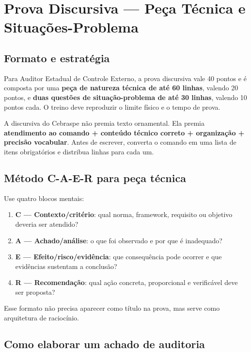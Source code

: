 \chapter{Prova Discursiva — Peça Técnica e Situações-Problema}

\section{Formato e estratégia}

Para Auditor Estadual de Controle Externo, a prova discursiva vale 40 pontos e é composta por uma \textbf{peça de natureza técnica de até 60 linhas}, valendo 20 pontos, e \textbf{duas questões de situação-problema de até 30 linhas}, valendo 10 pontos cada. O treino deve reproduzir o limite físico e o tempo de prova.

\begin{teoria}
A discursiva do Cebraspe não premia texto ornamental. Ela premia \textbf{atendimento ao comando + conteúdo técnico correto + organização + precisão vocabular}. Antes de escrever, converta o comando em uma lista de itens obrigatórios e distribua linhas para cada um.
\end{teoria}

\section{Método C-A-E-R para peça técnica}

Use quatro blocos mentais:
\begin{enumerate}
\item \textbf{C — Contexto/critério}: qual norma, framework, requisito ou objetivo deveria ser atendido?
\item \textbf{A — Achado/análise}: o que foi observado e por que é inadequado?
\item \textbf{E — Efeito/risco/evidência}: que consequência pode ocorrer e que evidências sustentam a conclusão?
\item \textbf{R — Recomendação}: qual ação concreta, proporcional e verificável deve ser proposta?
\end{enumerate}

Esse formato não precisa aparecer como título na prova, mas serve como arquitetura de raciocínio.

\section{Como elaborar um achado de auditoria}

